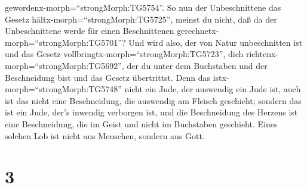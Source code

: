 gewordenx-morph=``strongMorph:TG5754''.  So nun der
Unbeschnittene das Gesetz hältx-morph=``strongMorph:TG5725'', meinst du
nicht, daß da der Unbeschnittene werde für einen Beschnittenen
gerechnetx-morph=``strongMorph:TG5701''?  Und wird also,
der von Natur unbeschnitten ist und das Gesetz
vollbringtx-morph=``strongMorph:TG5723'', dich
richtenx-morph=``strongMorph:TG5692'', der du unter dem Buchstaben und
der Beschneidung bist und das Gesetz übertrittst.  Denn das
istx-morph=``strongMorph:TG5748'' nicht ein Jude, der auswendig ein Jude
ist, auch ist das nicht eine Beschneidung, die auswendig am Fleisch
geschieht;  sondern das ist ein Jude, der's inwendig
verborgen ist, und die Beschneidung des Herzens ist eine Beschneidung,
die im Geist und nicht im Buchstaben geschieht. Eines solchen Lob ist
nicht aus Menschen, sondern aus Gott.

\hypertarget{section-2}{%
\section{3}\label{section-2}}

